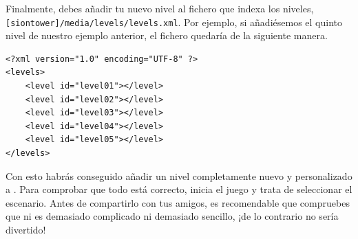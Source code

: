 \documentclass[a4paper,11pt]{article}
\begin{document}
Finalmente, debes añadir tu nuevo nivel al fichero que indexa los niveles,
\texttt{[siontower]/media/levels/levels.xml}. Por ejemplo, si añadiésemos
el quinto nivel de nuestro ejemplo anterior, el fichero quedaría de la
siguiente manera.

\begin{lstlisting}[style=xml]
<?xml version="1.0" encoding="UTF-8" ?>
<levels>
    <level id="level01"></level>
    <level id="level02"></level>
    <level id="level03"></level>
    <level id="level04"></level>
    <level id="level05"></level>
</levels>
\end{lstlisting}

Con esto habrás conseguido añadir un nivel completamente nuevo y personalizado
a \juego. Para comprobar que todo está correcto, inicia el juego y trata
de seleccionar el escenario. Antes de compartirlo con tus amigos, es recomendable
que compruebes que ni es demasiado complicado ni demasiado sencillo, ¡de lo
contrario no sería divertido!
\end{document}
